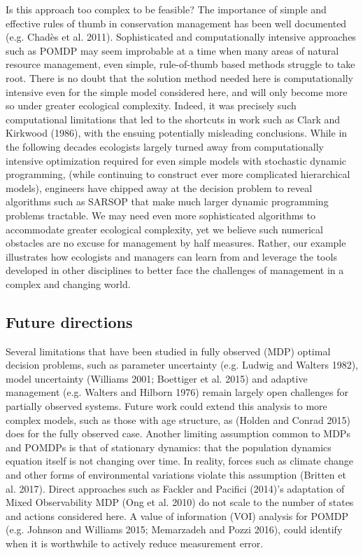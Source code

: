 \documentclass[3p]{elsarticle} %
\begin{document}
Is this approach too complex to be feasible? The importance of simple
and effective rules of thumb in conservation management has been well
documented (e.g. Chadès et al. 2011). Sophisticated and computationally
intensive approaches such as POMDP may seem improbable at a time when
many areas of natural resource management, even simple, rule-of-thumb
based methods struggle to take root. There is no doubt that the solution
method needed here is computationally intensive even for the simple
model considered here, and will only become more so under greater
ecological complexity. Indeed, it was precisely such computational
limitations that led to the shortcuts in work such as Clark and Kirkwood
(1986), with the ensuing potentially misleading conclusions. While in
the following decades ecologists largely turned away from
computationally intensive optimization required for even simple models
with stochastic dynamic programming, (while continuing to construct ever
more complicated hierarchical models), engineers have chipped away at
the decision problem to reveal algorithms such as SARSOP that make much
larger dynamic programming problems tractable. We may need even more
sophisticated algorithms to accommodate greater ecological complexity,
yet we believe such numerical obstacles are no excuse for management by
half measures. Rather, our example illustrates how ecologists and
managers can learn from and leverage the tools developed in other
disciplines to better face the challenges of management in a complex and
changing world.

\hypertarget{future-directions}{%
\subsection{Future directions}\label{future-directions}}

Several limitations that have been studied in fully observed (MDP)
optimal decision problems, such as parameter uncertainty (e.g. Ludwig
and Walters 1982), model uncertainty (Williams 2001; Boettiger et al.
2015) and adaptive management (e.g. Walters and Hilborn 1976) remain
largely open challenges for partially observed systems. Future work
could extend this analysis to more complex models, such as those with
age structure, as (Holden and Conrad 2015) does for the fully observed
case. Another limiting assumption common to MDPs and POMDPs is that of
stationary dynamics: that the population dynamics equation itself is not
changing over time. In reality, forces such as climate change and other
forms of environmental variations violate this assumption (Britten et
al. 2017). Direct approaches such as Fackler and Pacifici (2014)'s
adaptation of Mixed Observability MDP (Ong et al. 2010) do not scale to
the number of states and actions considered here. A value of information
(VOI) analysis for POMDP (e.g. Johnson and Williams 2015; Memarzadeh and
Pozzi 2016), could identify when it is worthwhile to actively reduce
measurement error.
\end{document}
